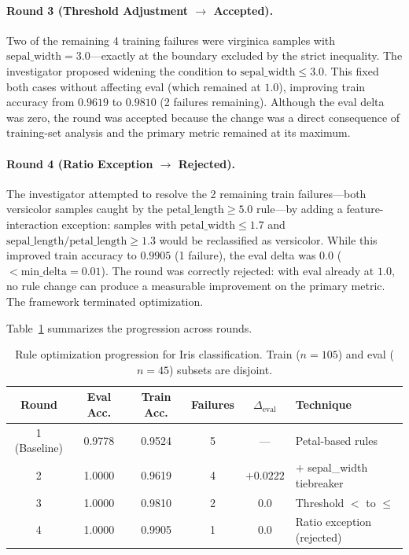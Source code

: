 \paragraph{Round 3 (Threshold Adjustment $\to$ Accepted).}
Two of the remaining 4 training failures were virginica samples with $\text{sepal\_width} = 3.0$---exactly at the boundary excluded by the strict inequality. The investigator proposed widening the condition to $\text{sepal\_width} \leq 3.0$. This fixed both cases without affecting eval (which remained at $1.0$), improving train accuracy from $0.9619$ to $0.9810$ (2 failures remaining). Although the eval delta was zero, the round was accepted because the change was a direct consequence of training-set analysis and the primary metric remained at its maximum.

\paragraph{Round 4 (Ratio Exception $\to$ Rejected).}
The investigator attempted to resolve the 2 remaining train failures---both versicolor samples caught by the $\text{petal\_length} \geq 5.0$ rule---by adding a feature-interaction exception: samples with $\text{petal\_width} \leq 1.7$ and $\text{sepal\_length}/\text{petal\_length} \geq 1.3$ would be reclassified as versicolor. While this improved train accuracy to $0.9905$ (1 failure), the eval delta was $0.0$ ($< \text{min\_delta} = 0.01$). The round was correctly rejected: with eval already at $1.0$, no rule change can produce a measurable improvement on the primary metric. The framework terminated optimization.

Table~\ref{tab:iris-progression} summarizes the progression across rounds.

\begin{table}[t]
  \centering
  \caption{Rule optimization progression for Iris classification. Train ($n{=}105$) and eval ($n{=}45$) subsets are disjoint.}
  \label{tab:iris-progression}
  \begin{tabular}{cccccl}
    \toprule
    Round & Eval Acc. & Train Acc. & Failures & $\Delta_{\text{eval}}$ & Technique \\
    \midrule
    1 (Baseline) & 0.9778 & 0.9524 & 5 & ---       & Petal-based rules \\
    2             & 1.0000 & 0.9619 & 4 & $+0.0222$ & $+$ sepal\_width tiebreaker \\
    3             & 1.0000 & 0.9810 & 2 & $0.0$     & Threshold $<$ to $\leq$ \\
    4             & 1.0000 & 0.9905 & 1 & $0.0$     & Ratio exception (rejected) \\
    \bottomrule
  \end{tabular}
\end{table}

